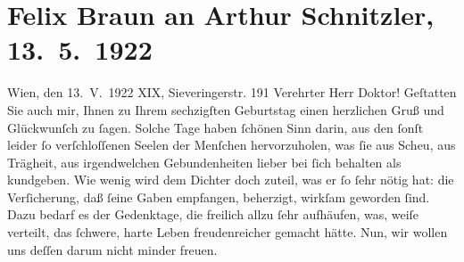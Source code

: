 

         \renewcommand{\erwaehnteOrte}{Orte: Sieveringer Straße, Wien}
         \renewcommand{\erwaehnteWerke}{}
               \section[Felix Braun an Arthur Schnitzler, 13. 5. 1922]{ Felix Braun an Arthur Schnitzler, 13. 5. 1922}\nopagebreak{}\rehead{ }\begin{ledgroupsized}[t]{13cm}\normalsize\beginnumbering \toendnotes[C]{\smallbreak\pagebreak[2]} 
\toendnotes[C]{\smallbreak}\pstart
           \raggedleft{}{\pb}Wien, den 13. V. 1922\pend
           \pstart
           \raggedleft{}XIX, Sieveringerstr. 191\pend
           \pstart{}Verehrter Herr Doktor!\pend\pstart
           Geſtatten Sie auch mir, Ihnen zu Ihrem sechzigſten Geburtstag einen herzlichen Gruß
               und Glückwunſch zu ſagen. Solche Tage haben \label{T_L02381_1v}\label{T_L02381_1h} ſchönen Sinn darin, aus den ſonſt
               leider ſo verſchloſſenen Seelen der Menſchen hervorzuholen, was ſie aus Scheu, aus
               Trägheit, aus irgendwelchen Gebundenheiten lieber bei ſich behalten als kundgeben.
               Wie wenig wird dem Dichter doch zuteil, was er ſo ſehr nötig hat: die Verſicherung,
               daß ſeine Gaben empfangen, beherzigt, wirkſam geworden ſind. Dazu bedarf es der
               Gedenktage, die freilich allzu ſehr aufhäufen, was, weiſe verteilt, das ſchwere,
               harte Leben freudenreicher gemacht hätte. Nun, wir wollen uns deſſen darum nicht
               minder freuen.\pend

\end{ledgroupsized}

